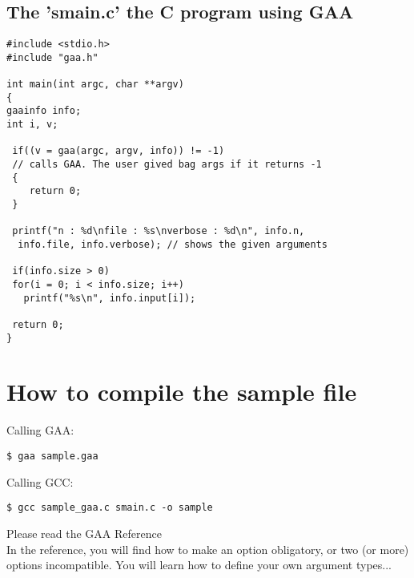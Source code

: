 \subsection{The 'smain.c' the C program using GAA}
\begin{verbatim}
#include <stdio.h>
#include "gaa.h"

int main(int argc, char **argv)
{
gaainfo info;
int i, v;

 if((v = gaa(argc, argv, info)) != -1) 
 // calls GAA. The user gived bag args if it returns -1
 {
    return 0;
 }
 
 printf("n : %d\nfile : %s\nverbose : %d\n", info.n,
  info.file, info.verbose); // shows the given arguments

 if(info.size > 0)
 for(i = 0; i < info.size; i++)
   printf("%s\n", info.input[i]);

 return 0;
}

\end{verbatim}


\section{ How to compile the sample file}
\par 
Calling GAA:

\begin{verbatim}
$ gaa sample.gaa
\end{verbatim}

\par Calling GCC:

\begin{verbatim}
$ gcc sample_gaa.c smain.c -o sample
\end{verbatim}

\par Please read the GAA Reference \\
In the reference, you will find how to make an option
obligatory, or two (or more) options incompatible. You will learn how to
define your own argument types...

